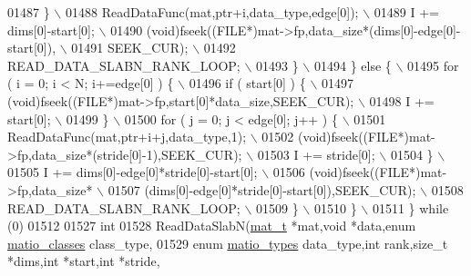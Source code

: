 \begin{DoxyCode}
{{{{{01487 \textcolor{preprocessor}{                \} \(\backslash\)}
01488 \textcolor{preprocessor}{                ReadDataFunc(mat,ptr+i,data\_type,edge[0]); \(\backslash\)}
01489 \textcolor{preprocessor}{                I += dims[0]-start[0]; \(\backslash\)}
01490 \textcolor{preprocessor}{                (void)fseek((FILE*)mat->fp,data\_size*(dims[0]-edge[0]-start[0]), \(\backslash\)}
01491 \textcolor{preprocessor}{                    SEEK\_CUR); \(\backslash\)}
01492 \textcolor{preprocessor}{                READ\_DATA\_SLABN\_RANK\_LOOP; \(\backslash\)}
01493 \textcolor{preprocessor}{            \} \(\backslash\)}
01494 \textcolor{preprocessor}{        \} else \{ \(\backslash\)}
01495 \textcolor{preprocessor}{            for ( i = 0; i < N; i+=edge[0] ) \{ \(\backslash\)}
01496 \textcolor{preprocessor}{                if ( start[0] ) \{ \(\backslash\)}
01497 \textcolor{preprocessor}{                    (void)fseek((FILE*)mat->fp,start[0]*data\_size,SEEK\_CUR); \(\backslash\)}
01498 \textcolor{preprocessor}{                    I += start[0]; \(\backslash\)}
01499 \textcolor{preprocessor}{                \} \(\backslash\)}
01500 \textcolor{preprocessor}{                for ( j = 0; j < edge[0]; j++ ) \{ \(\backslash\)}
01501 \textcolor{preprocessor}{                    ReadDataFunc(mat,ptr+i+j,data\_type,1); \(\backslash\)}
01502 \textcolor{preprocessor}{                    (void)fseek((FILE*)mat->fp,data\_size*(stride[0]-1),SEEK\_CUR); \(\backslash\)}
01503 \textcolor{preprocessor}{                    I += stride[0]; \(\backslash\)}
01504 \textcolor{preprocessor}{                \} \(\backslash\)}
01505 \textcolor{preprocessor}{                I += dims[0]-edge[0]*stride[0]-start[0]; \(\backslash\)}
01506 \textcolor{preprocessor}{                (void)fseek((FILE*)mat->fp,data\_size* \(\backslash\)}
01507 \textcolor{preprocessor}{                    (dims[0]-edge[0]*stride[0]-start[0]),SEEK\_CUR); \(\backslash\)}
01508 \textcolor{preprocessor}{                READ\_DATA\_SLABN\_RANK\_LOOP; \(\backslash\)}
01509 \textcolor{preprocessor}{            \} \(\backslash\)}
01510 \textcolor{preprocessor}{        \} \(\backslash\)}
01511 \textcolor{preprocessor}{    \} while (0)}
01512 
01527 \textcolor{keywordtype}{int}
01528 ReadDataSlabN(\hyperlink{struct__mat__t}{mat\_t} *mat,\textcolor{keywordtype}{void} *data,\textcolor{keyword}{enum} \hyperlink{group___m_a_t_gad4d60ae7b709fc81bfd744fb4c857c40}{matio\_classes} class\_type,
01529     \textcolor{keyword}{enum} \hyperlink{group___m_a_t_gacf7b3b879282b7ab3a51190e49bf3453}{matio\_types} data\_type,\textcolor{keywordtype}{int} rank,\textcolor{keywordtype}{size\_t} *dims,\textcolor{keywordtype}{int} *start,\textcolor{keywordtype}{int} *stride,
}}}}}
\end{DoxyCode}
